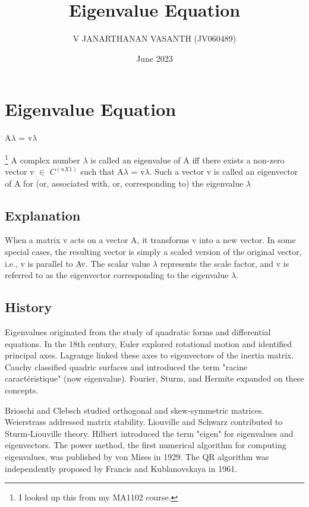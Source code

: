 \documentclass{report}
\begin{document}
\title{Eigenvalue Equation}
\author{V JANARTHANAN VASANTH (JV060489)}
\date{June 2023}
\maketitle
\renewcommand{\thesection}{\arabic{section}}
\renewcommand{\thesubsection}{\arabic{section}.\arabic{subsection}}
\section{Eigenvalue Equation}
\centerline{A$\lambda$ = v$\lambda$}\footnote{I looked up this from my MA1102 course.}
A complex number $\lambda$ is called an eigenvalue of A iff there exists a
non-zero vector v $\in$ $C^(nX1)$ such that   A$\lambda$ = v$\lambda$. Such a vector v is called an eigenvector
of A for (or, associated with, or, corresponding to) the eigenvalue $\lambda$


\vspace{\baselineskip}
\subsection{Explanation}

When a matrix v acts on a vector A, it transforms v into a new vector. In some special cases, the resulting vector is simply a scaled version of the original vector, i.e., v is parallel to Av. The scalar value $\lambda$ represents the scale factor, and v is referred to as the eigenvector corresponding to the eigenvalue $\lambda$.


\vspace{\baselineskip}
\subsection{History}
Eigenvalues originated from the study of quadratic forms and differential equations. In the 18th century, Euler explored rotational motion and identified principal axes. Lagrange linked these axes to eigenvectors of the inertia matrix. Cauchy classified quadric surfaces and introduced the term "racine caractéristique" (now eigenvalue). Fourier, Sturm, and Hermite expanded on these concepts.

Brioschi and Clebsch studied orthogonal and skew-symmetric matrices. Weierstrass addressed matrix stability. Liouville and Schwarz contributed to Sturm-Liouville theory. Hilbert introduced the term "eigen" for eigenvalues and eigenvectors. The power method, the first numerical algorithm for computing eigenvalues, was published by von Mises in 1929. The QR algorithm was independently proposed by Francis and Kublanovskaya in 1961.
\end{document}
